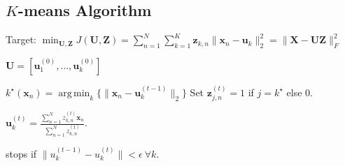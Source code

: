 \documentclass[a4paper, 11pt, landscape]{article}
\DeclareMathOperator*{\argmin}{arg\,min}
\begin{document}
\begin{multicols*}{3}
    \section{$K$-means Algorithm}
    \begin{inparadesc}
    \item[\color{red}Target:] $\min_{\mathbf{U}, \mathbf{Z}} J(\mathbf{U}, \mathbf{Z}) 
        = \sum_{n=1}^N \sum_{k=1}^K \mathbf{z}_{k,n} \|\mathbf{x}_n - \mathbf{u}_k\|_2^2 
        = \|\mathbf{X} - \mathbf{U} \mathbf{Z}\|_F^2 $
    \end{inparadesc}
    \begin{inparaenum}
    \item $\mathbf{U} = [\mathbf{u}_1^{(0)}, \ldots, \mathbf{u}_k^{(0)}]$ 
    \item $k^\star(\mathbf{x}_n) = \argmin_k \{ \|\mathbf{x}_n - \mathbf{u}_k^{(t-1)}\|_2 \}$ 
        Set $\mathbf{z}_{j,n}^{(t)} = 1$ if $j = k^\star$ else $0$.
    \item $\mathbf{u}_k^{(t)} = \frac{\sum_{n=1}^N z_{k,n}^{(t)} \mathbf{x}_n}{\sum_{n=1}^N z_{k,n}^{(t)}}$.
    \item stops if $\|u_k^{(t-1)} - u_k^{(t)}\| < \epsilon \ \forall k$.
    \end{inparaenum}



\end{multicols*}
\end{document}
